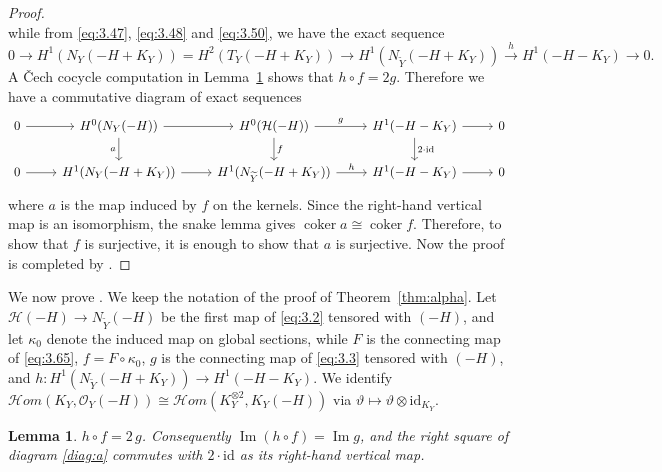 \documentclass[11pt,twoside]{amsart}
\theoremstyle{plain}
\newtheorem{lemma}[theorem]{Lemma}
\theoremstyle{definition}
\newcommand{\OO}{\mathcal{O}}
\newcommand{\sHom}{\mathcal{H}om}
\newcommand{\coker}{\operatorname{coker}}
\renewcommand{\Im}{\operatorname{Im}}
\newcommand{\id}{\mathrm{id}}
\newcommand{\Yt}{\widetilde{Y}}
\newcommand{\NY}{N_{Y}}
\newcommand{\NYt}{N_{\Yt}}
\newcommand{\Hc}{\mathcal{H}}
\begin{document}
\begin{proof}
\[\]
while from \eqref{eq:3.47}, \eqref{eq:3.48} and \eqref{eq:3.50}, we have the exact sequence
\[
0\to H^1(\NY(-H+K_Y))=H^2(T_Y(-H+K_Y))\to H^1(\NYt(-H+K_Y))\xrightarrow{\ h\ } H^1(-H-K_Y)\to 0 .
\]
A \v{C}ech cocycle computation in Lemma~\ref{lem:hfg} shows that $h\circ f=2g$. Therefore we have a commutative diagram of exact sequences
\begin{equation}\label{diag:a}
\begin{tikzcd}[column sep=normal]
0\arrow[r] & H^0(\NY(-H))\arrow[r]\arrow[d,"a"'] & H^0(\Hc(-H))\arrow[r,"g"]\arrow[d,"f"] & H^1(-H-K_Y)\arrow[r]\arrow[d,"2\cdot\id"] & 0\\
0\arrow[r] & H^1(\NY(-H+K_Y))\arrow[r] & H^1(\NYt(-H+K_Y))\arrow[r,"h"] & H^1(-H-K_Y)\arrow[r] & 0
\end{tikzcd}
\end{equation}
where $a$ is the map induced by $f$ on the kernels. Since the right-hand vertical map is an isomorphism, the snake lemma gives $\coker a\cong\coker f$. Therefore, to show that $f$ is surjective, it is enough to show that $a$ is surjective. Now the proof is completed by  .
\end{proof}

We now prove . We keep the notation of the proof of Theorem~\ref{thm:alpha}. Let $\Hc(-H)\to\NYt(-H)$ be the first map of \eqref{eq:3.2} tensored with $(-H)$, and let $\kappa_0$ denote the induced map on global sections, while $F$ is the connecting map of \eqref{eq:3.65}, $f=F\circ\kappa_0$, $g$ is the connecting map of \eqref{eq:3.3} tensored with $(-H)$, and $h: H^1(\NYt(-H+K_Y))\to  H^1(-H-K_Y)$.
We identify $\sHom(K_Y,\OO_Y(-H))\cong\sHom(K_Y^{\otimes2},K_Y(-H))$ via $\vartheta\mapsto\vartheta\otimes\id_{K_Y}$.

\begin{lemma}\label{lem:hfg}
$h\circ f=2\,g$. Consequently $\Im(h\circ f)=\Im g$, and the right square of diagram \eqref{diag:a} commutes with $2\cdot\id$ as its right-hand vertical map.
\end{lemma}
\end{document}
